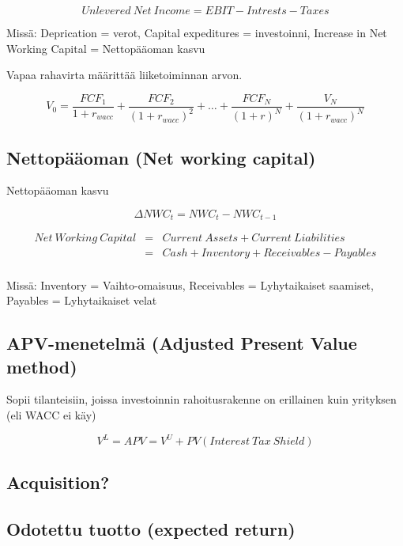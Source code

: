 \documentclass[a4paper]{article}
\begin{document}
\[Unlevered\ Net\ Income = EBIT - Intrests - Taxes\]


Missä: Deprication = verot, Capital expeditures = investoinni, Increase in Net Working Capital = Nettopääoman kasvu

Vapaa rahavirta määrittää liiketoiminnan arvon.

\[
V_0 = \frac{FCF_1}{1 + r_{wacc}} + \frac{FCF_2}{(1 + r_{wacc})^2} + \dots + \frac{FCF_N}{(1 + r)^N} + \frac{V_N}{(1 + r_{wacc})^N}
\]

\subsection{Nettopääoman (Net working capital)}

Nettopääoman kasvu

\[ \Delta NWC_t = NWC_t - NWC_{t-1} \]

\[
\begin{array}{lcl}
Net\ Working\ Capital & = & Current\ Assets + Current\ Liabilities \\
 & = & Cash + Inventory + Receivables - Payables \\
\end{array}
\]

Missä: Inventory = Vaihto-omaisuus, Receivables = Lyhytaikaiset saamiset, Payables = Lyhytaikaiset velat

\subsection{APV-menetelmä (Adjusted Present Value method)}

Sopii tilanteisiin, joissa investoinnin rahoitusrakenne on erillainen kuin yrityksen (eli WACC ei käy)

\[ V^L = APV = V^U + PV(Interest\ Tax\ Shield) \]

\subsection{Acquisition?}


\subsection{Odotettu tuotto (expected return)}
\end{document}
